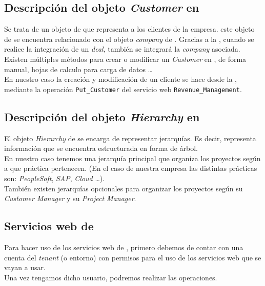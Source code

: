 \subsection{Descripción del objeto \textit{Customer} en \wday{}}
Se trata de un objeto de \wday{} que representa a los clientes de la empresa. este objeto de \wday{} se encuentra relacionado con el objeto \textit{company} de \hs. 
Gracias a la \iface{}, cuando se realice la integración de un \textit{deal}, también se integrará la \textit{company} asociada.\\

Existen múltiples métodos para crear o modificar un \textit{Customer} en \wday{}, de forma manual, hojas de calculo para carga de datos \ldots\\

En nuestro caso la creación y modificación de un cliente se hace desde la \iface{}, 
mediante la operación \texttt{Put\_Customer} del servicio web \texttt{Revenue\_Management}.

\subsection{Descripción del objeto \textit{Hierarchy} en \wday{}}

El objeto \textit{Hierarchy} de \wday{} se encarga de representar jerarquías.
Es decir, representa información que se encuentra estructurada en forma de árbol.\\

En nuestro caso tenemos una jerarquía principal que organiza los proyectos según a que práctica pertenecen. 
(En el caso de nuestra empresa las distintas prácticas son: \textit{PeopleSoft}, \textit{SAP}, \textit{Cloud} \ldots).\\

También existen jerarquías opcionales para organizar los proyectos según su \textit{Customer Manager} y su \textit{Project Manager}.

\subsection{Servicios web de \wday{}}

Para hacer uso de los servicios web de \wday{}, primero debemos de contar con una cuenta del \textit{tenant} (o entorno) con permisos para el uso de los servicios web que se vayan a usar.\\

Una vez tengamos dicho usuario, podremos realizar las operaciones.\\

